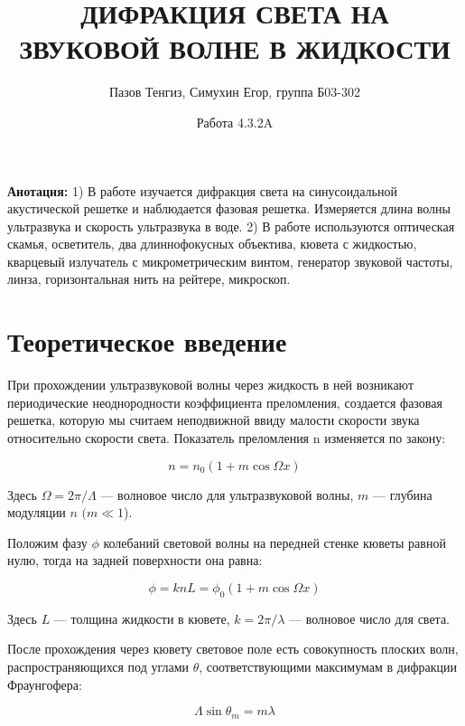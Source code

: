 \documentclass[a4paper,12pt]{article}
\title{ДИФРАКЦИЯ СВЕТА НА ЗВУКОВОЙ ВОЛНЕ В ЖИДКОСТИ}
\date{Работа 4.3.2A}
\author{Пазов Тенгиз, Симухин Егор, группа Б03-302}
\begin{document}
		\vspace{0.5 cm}
	\maketitle
	\vspace{0.5 cm}
	
	\textbf{Анотация:} 1) В работе изучается дифракция света на синусоидальной акустической решетке и наблюдается фазовая решетка.
Измеряется длина волны ультразвука и скорость ультразвука в воде.
2) В работе используются оптическая скамья, осветитель, два длиннофокусных объектива, кювета с жидкостью, кварцевый излучатель с микрометрическим винтом, генератор звуковой частоты, линза, горизонтальная нить на рейтере, микроскоп.
	
	\section*{Теоретическое введение}
При прохождении ультразвуковой волны через жидкость в ней возникают периодические неоднородности коэффициента преломления, создается фазовая решетка, которую мы считаем неподвижной ввиду малости скорости звука относительно скорости света. Показатель
	преломления n изменяется по закону:
	
	\begin{equation}\label{}
	n = n_0 (1 + m \cos \Omega x)
	\end{equation}
	
	Здесь $ \Omega = 2 \pi / \Lambda $ --- волновое число для ультразвуковой волны, $ m $ --- глубина модуляции $ n $ $ (m \ll 1 $).
	
	Положим фазу $ \phi $ колебаний световой волны на передней стенке кюветы равной нулю, тогда на задней поверхности она равна:
	
	\begin{equation}\label{}
	\phi  = k n L = \phi_0 (1 + m \cos \Omega x)
	\end{equation}
	
	Здесь $ L $ --- толщина жидкости в кювете, $ k = 2 \pi / \lambda $ --- волновое число для света.
	
	После прохождения через кювету световое поле есть совокупность плоских волн, распространяющихся под углами $ \theta $, соответствующими максимумам в дифракции Фраунгофера:
	
\begin{equation}\label{}	
	\Lambda \sin \theta_m = m \lambda
\end{equation}
\end{document}
